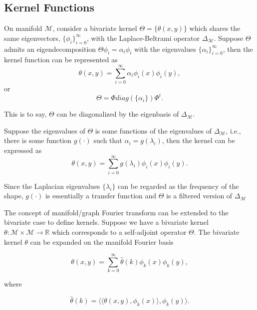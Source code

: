 \subsection{Kernel Functions}

On manifold $\mathcal{M}$, consider a bivariate kernel $\Theta=\{\theta(x,y)\}$
which shares the same eigenvectors, $\{\phi_i\}_{i=0}^\infty$, with the Laplace-Beltrami
operator $\Delta_\mathcal{M}$. Suppose $\Theta$ admits an eigendecomposition
$\Theta\phi_i = \alpha_i \phi_i$ with the eigenvalues $\{\alpha_i\}_{i=0}^\infty$,
then the kernel function can be represented as
\begin{equation}
\theta(x,y)=\sum_{i=0}^\infty \alpha_i \phi_i(x) \phi_i(y),
\end{equation}
or
\begin{equation}
\Theta=\Phi diag(\{\alpha_i\}) \Phi^t.
\end{equation}

This is to say, $\Theta$ can be diagonalized by the eigenbasis of $\Delta_\mathcal{M}$.

Suppose the eigenvalues of $\Theta$ is some functions of the eigenvalues of $\Delta_\mathcal{M}$,
i.e., there is some function $g(\cdot)$ such that $\alpha_i=g(\lambda_i)$, then the kernel
can be expressed as
\begin{equation}
\theta(x,y)=\sum_{i=0}^\infty g(\lambda_i) \phi_i(x) \phi_i(y).
\end{equation}

Since the Laplacian eigenvalues $\{\lambda_i\}$ can be regarded as the frequency of the shape,
$g(\cdot)$ is essentially a transfer function and $\Theta$ is a filtered version of
$\Delta_\mathcal{M}$


The concept of manifold/graph Fourier transform can be extended to the
bivariate case to define kernels. Suppose we have a bivariate kernel
$\theta:\mathcal{M}\times\mathcal{M}\to\mathbb{R}$ which corresponds to a
self-adjoint operator $\Theta$. The bivariate kernel $\theta$ can be expanded
on the manifold Fourier basis

\begin{equation}
\theta(x,y)=\sum_{k=0}^\infty \hat{\theta}(k)\phi_k(x)\phi_k(y),
\end{equation}

where

\begin{equation}
\hat{\theta}(k)=\langle\langle\theta(x,y),\phi_k(x)\rangle,\phi_k(y)\rangle.
\end{equation}

